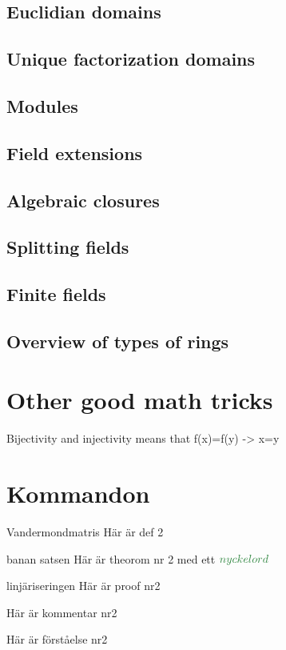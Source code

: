 \documentclass[a4paper]{article}
\begin{document}
\subsection{Euclidian domains}
\subsection{Unique factorization domains}
\subsection{Modules}
\subsection{Field extensions}
\subsection{Algebraic closures}
\subsection{Splitting fields}
\subsection{Finite fields}
\subsection{Overview of types of rings}

\section{Other good math tricks}

Bijectivity and injectivity means that f(x)=f(y) -> x=y


\section{Kommandon}

\begin{defi}{Vandermondmatris}
    Här är def 2
\end{defi}

\begin{ther}{banan satsen}
    Här är theorom nr 2 med ett $\key{nyckelord}$
\end{ther}

\begin{prf}{linjäriseringen}
Här är proof nr2
\end{prf}

\begin{add}
Här är kommentar nr2
\end{add}

\begin{aha}
Här är förståelse nr2
\end{aha}
\end{document}
